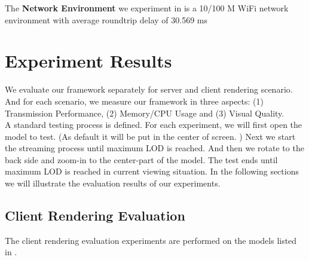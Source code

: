 The \textbf{Network Environment} we experiment in is a 10/100 M WiFi network environment with average roundtrip delay of 30.569 ms

\section{Experiment Results }
\label{section:expresult}
We evaluate our framework separately for server and client rendering scenario. And for each scenario, we measure our framework in three aspects: (1) Transmission Performance, (2) Memory/CPU Usage and (3) Visual Quality. \\

A standard testing process is defined. For each experiment, we will first open the model to test. (As default it will be put in the center of screen. ) Next we start the streaming process until maximum LOD is reached. And then we rotate to the back side and zoom-in to the center-part of the model. The test ends until maximum LOD is reached in current viewing situation. In the following sections we will illustrate the evaluation results of our experiments. 

\subsection{Client Rendering Evaluation}
\label{section:clienteva}
The client rendering evaluation experiments are performed on the models listed in . 
